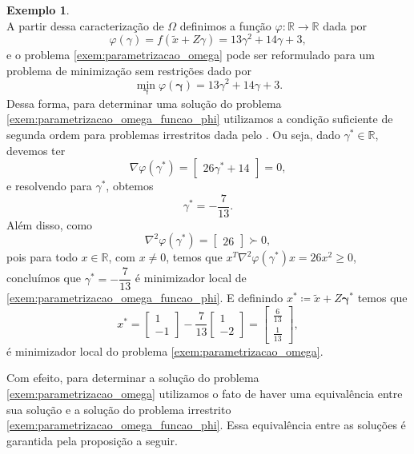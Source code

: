 \documentclass[12pt,a4paper]{scrartcl}
\def\RR{\mathds{R}}
\theoremstyle{definition}%
\newtheorem{exem}{Exemplo}
\begin{document}
\begin{exem}
\[\]
A partir dessa caracterização de $\Omega$ definimos a função $\varphi : \RR \rightarrow \RR$ dada por 
\[
\varphi(\gamma) = f(\tilde{x} + Z\gamma) = 13\gamma^{2} + 14\gamma +3 ,
\]
e o problema \eqref{exem:parametrizacao_omega} pode ser reformulado para um problema de minimização sem restrições dado por
\[ \label{exem:parametrizacao_omega_funcao_phi}
\min_{\boldsymbol{\gamma}} \varphi (\boldsymbol{\gamma}) = 13\gamma^{2} + 14\gamma +3 .
\]
Dessa forma, para determinar uma solução do problema \eqref{exem:parametrizacao_omega_funcao_phi} utilizamos a condição suficiente de segunda ordem para problemas irrestritos dada pelo . Ou seja, dado $\gamma^{*} \in \RR$, devemos ter
\[
\nabla \varphi(\gamma^{*}) = \begin{bmatrix*} 26 \gamma^{*} +14 \end{bmatrix*} = 0 ,
\]
e resolvendo para $\gamma^{*}$, obtemos
\[
\gamma^{*} = - \dfrac{7}{13} .
\]
Além disso, como
\[
\nabla^{2} \varphi(\gamma^{*}) = \begin{bmatrix*} 26 \end{bmatrix*} \succ 0 ,
\]
pois para todo $x\in \RR$, com $x\neq 0$, temos que $x^{T}\nabla^{2} \varphi(\gamma^{*})x = 26x^{2} \geq 0$, concluímos que $\gamma^{*} =  -\dfrac{7}{13}$ é minimizador local de \eqref{exem:parametrizacao_omega_funcao_phi}. E definindo $x^{*} \coloneqq  \tilde{x} + Z\boldsymbol{\gamma}^{*}$ temos que 
\[
x^{*} = \begin{bmatrix*} 1 \\ -1 \end{bmatrix*}  -\dfrac{7}{13}\begin{bmatrix*} 1 \\ -2 \end{bmatrix*}  = \begin{bmatrix*} \frac{6}{13} \\ \frac{1}{13} \end{bmatrix*} ,
\]
é minimizador local do problema \eqref{exem:parametrizacao_omega}.
\end{exem}

Com efeito, para determinar a solução do problema \eqref{exem:parametrizacao_omega} utilizamos o fato de haver uma equivalência entre sua solução e a solução do problema irrestrito \eqref{exem:parametrizacao_omega_funcao_phi}. Essa equivalência entre as soluções é garantida pela proposição a seguir.
\end{document}
